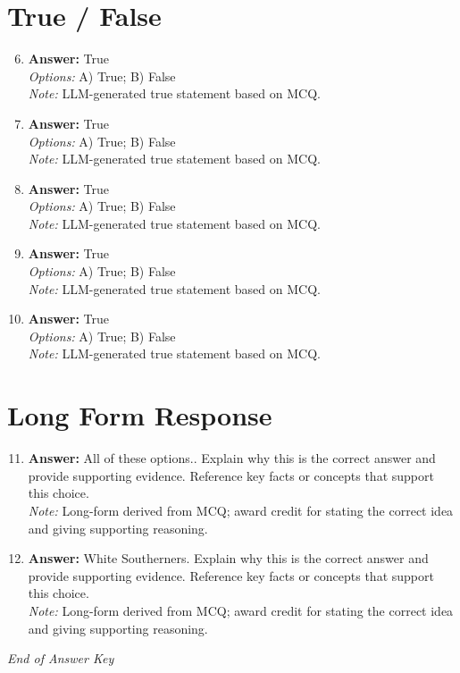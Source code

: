 \documentclass[12pt]{article}
\begin{document}
\section*{True / False}
\begin{enumerate}[label=\arabic*.]
\setcounter{enumi}{5}
\item \textbf{Answer:} True
\\ \textit{Options:} A) True; B) False
\\ \textit{Note:} LLM-generated true statement based on MCQ.
\item \textbf{Answer:} True
\\ \textit{Options:} A) True; B) False
\\ \textit{Note:} LLM-generated true statement based on MCQ.
\item \textbf{Answer:} True
\\ \textit{Options:} A) True; B) False
\\ \textit{Note:} LLM-generated true statement based on MCQ.
\item \textbf{Answer:} True
\\ \textit{Options:} A) True; B) False
\\ \textit{Note:} LLM-generated true statement based on MCQ.
\item \textbf{Answer:} True
\\ \textit{Options:} A) True; B) False
\\ \textit{Note:} LLM-generated true statement based on MCQ.
\end{enumerate}

\section*{Long Form Response}
\begin{enumerate}[label=\arabic*.]
\setcounter{enumi}{10}
\item \textbf{Answer:} All of these options.. Explain why this is the correct answer and provide supporting evidence. Reference key facts or concepts that support this choice.
\\ \textit{Note:} Long-form derived from MCQ; award credit for stating the correct idea and giving supporting reasoning.
\item \textbf{Answer:} White Southerners. Explain why this is the correct answer and provide supporting evidence. Reference key facts or concepts that support this choice.
\\ \textit{Note:} Long-form derived from MCQ; award credit for stating the correct idea and giving supporting reasoning.
\end{enumerate}

\vfill
\noindent\textit{End of Answer Key}
\end{document}
